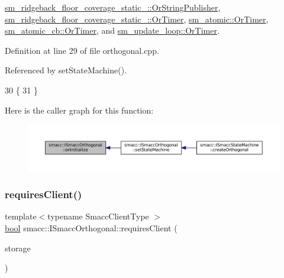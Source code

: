\hyperlink{classsm__ridgeback__floor__coverage__static__1_1_1OrStringPublisher_acf3ba60692bf9626ea438efde03c266d}{sm\+\_\+ridgeback\+\_\+floor\+\_\+coverage\+\_\+static\+\_\+::\+Or\+String\+Publisher}, \hyperlink{classsm__ridgeback__floor__coverage__static__1_1_1OrTimer_ab7e12a43aebecc3e6981b33552703dd1}{sm\+\_\+ridgeback\+\_\+floor\+\_\+coverage\+\_\+static\+\_\+::\+Or\+Timer}, \hyperlink{classsm__atomic_1_1OrTimer_a509b0d9ce7c6ed9e0c291decaf6dd280}{sm\+\_\+atomic\+::\+Or\+Timer}, \hyperlink{classsm__atomic__cb_1_1OrTimer_a0d010997d6304786b2b91ae3f32fa978}{sm\+\_\+atomic\+\_\+cb\+::\+Or\+Timer}, and \hyperlink{classsm__update__loop_1_1OrTimer_af2b4637bc236bcaada12b703c5f0a110}{sm\+\_\+update\+\_\+loop\+::\+Or\+Timer}.



Definition at line 29 of file orthogonal.\+cpp.



Referenced by set\+State\+Machine().


\begin{DoxyCode}
30   \{
31   \}
\end{DoxyCode}
Here is the caller graph for this function\+:
\nopagebreak
\begin{figure}[H]
\begin{center}
\leavevmode
\includegraphics[width=350pt]{classsmacc_1_1ISmaccOrthogonal_a6bb31c620cb64dd7b8417f8705c79c7a_icgraph}
\end{center}
\end{figure}
\mbox{\label{classsmacc_1_1ISmaccOrthogonal_a602e16b09f8a1b3de889f2f3d90a3211}} 
\subsubsection{\texorpdfstring{requires\+Client()}{requiresClient()}}
{\footnotesize\ttfamily template$<$typename Smacc\+Client\+Type $>$ \\
\hyperlink{classbool}{bool} smacc\+::\+I\+Smacc\+Orthogonal\+::requires\+Client (\begin{DoxyParamCaption}\item[{Smacc\+Client\+Type $\ast$\&}]{storage }\end{DoxyParamCaption})}



